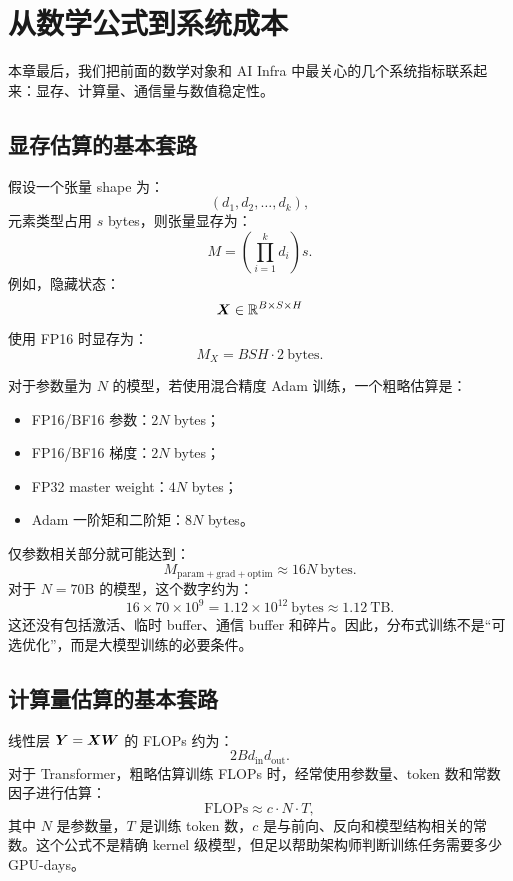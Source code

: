 \section{从数学公式到系统成本}
\label{sec:from-formula-to-system-cost}

本章最后，我们把前面的数学对象和 AI Infra 中最关心的几个系统指标联系起来：显存、计算量、通信量与数值稳定性。

\subsection{显存估算的基本套路}
\label{subsec:memory-estimation-basics}

假设一个张量 shape 为：
\[
  (d_1,d_2,\ldots,d_k),
\]
元素类型占用 $s$ bytes，则张量显存为：
\[
  M=\left(\prod_{i=1}^{k}d_i\right)s.
\]
例如，隐藏状态：
\[
  \bm{X}\in\mathbb{R}^{B\times S\times H}
\]
使用 FP16 时显存为：
\[
  M_X=B S H \cdot 2\ \mathrm{bytes}.
\]

对于参数量为 $N$ 的模型，若使用混合精度 Adam 训练，一个粗略估算是：

\begin{itemize}
  \item FP16/BF16 参数：$2N$ bytes；
  \item FP16/BF16 梯度：$2N$ bytes；
  \item FP32 master weight：$4N$ bytes；
  \item Adam 一阶矩和二阶矩：$8N$ bytes。
\end{itemize}

仅参数相关部分就可能达到：
\[
  M_{\mathrm{param+grad+optim}}
  \approx
  16N\ \mathrm{bytes}.
\]
对于 $N=70\mathrm{B}$ 的模型，这个数字约为：
\[
  16\times 70\times 10^9
  =
  1.12\times 10^{12}\ \mathrm{bytes}
  \approx
  1.12\ \mathrm{TB}.
\]
这还没有包括激活、临时 buffer、通信 buffer 和碎片。因此，分布式训练不是“可选优化”，而是大模型训练的必要条件。

\subsection{计算量估算的基本套路}
\label{subsec:flops-estimation-basics}

线性层 $\bm{Y}=\bm{X}\bm{W}$ 的 FLOPs 约为：
\[
  2B d_{\mathrm{in}}d_{\mathrm{out}}.
\]
对于 Transformer，粗略估算训练 FLOPs 时，经常使用参数量、token 数和常数因子进行估算：
\[
  \mathrm{FLOPs}
  \approx
  c\cdot N\cdot T,
\]
其中 $N$ 是参数量，$T$ 是训练 token 数，$c$ 是与前向、反向和模型结构相关的常数。这个公式不是精确 kernel 级模型，但足以帮助架构师判断训练任务需要多少 GPU-days。

